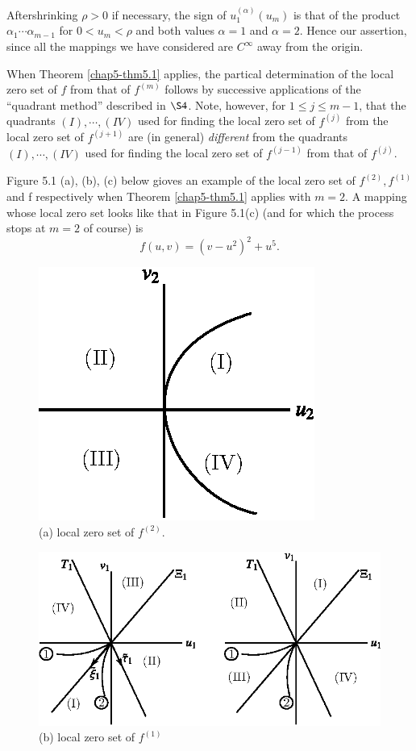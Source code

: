 After\pageoriginale shrinking $\rho > 0$ if necessary, the sign of $u_{1}^{(\alpha)} (u_{m})$ is that of the product $\alpha_{1} \cdots \alpha_{m-1}$ for $0 < u_{m} < \rho$ and both values $\alpha = 1$ and $\alpha = 2$. Hence our assertion, since all the mappings we have considered are $C^{\infty}$ away from the origin.

When Theorem \ref{chap5-thm5.1} applies, the partical determination of the local zero set of $f$ from that of $f^{(m)}$ follows by successive applications of the ``quadrant method'' described in $\S 4$. Note, however, for $1 \leq j \leq m-1$, that the quadrants $(I), \cdots, (IV)$ used for finding the local zero set of $f^{(j)}$ from the local zero set of $f^{(j+1)}$ are (in general) {\em different} from the quadrants $(I), \cdots , (IV)$ used for finding the local zero set of $f^{(j-1)}$ from that of $f^{(j)}$.

Figure 5.1 (a), (b), (c) below gioves an example of the local zero set of $f^{(2)}, f^{(1)}$ and f respectively when Theorem \ref{chap5-thm5.1} applies with $m = 2$. A mapping whose local zero set looks like that in Figure 5.1(c) (and for which the process stops at $m = 2$ of course) is
$$
f(u, v) = (v-u^{2})^{2} + u^{5}.
$$
\setcounter{figure}{0}
\begin{figure}[H]
\centering
\includegraphics{figure/fig76-5.1a.eps}
\caption{(a) local zero set of $f^{(2)}$.}
\end{figure}

\setcounter{figure}{0}
\begin{figure}[H]
\centering
\includegraphics{figure/fig76-5.1b.eps}
\caption{(b) local zero set of $f^{(1)}$}
\end{figure}

